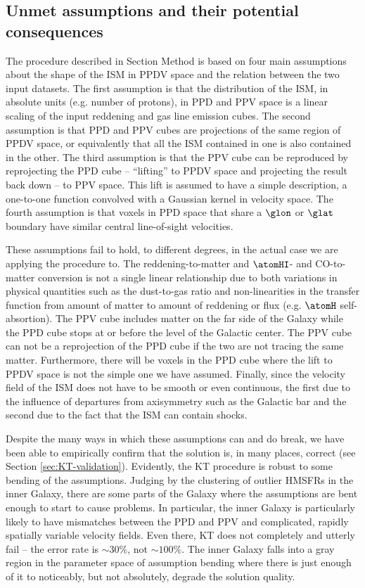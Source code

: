 \subsection{Unmet assumptions and their potential consequences}
\label{sec:discussion-systematics}
The procedure described in Section Method is based on four main assumptions about the shape of the ISM in PPDV space and the relation between the two input datasets.
The first assumption is that the distribution of the ISM, in absolute units (e.g. number of protons), in PPD and PPV space is a linear scaling of the input reddening and gas line emission cubes.
The second assumption is that PPD and PPV cubes are projections of the same region of PPDV space, or equivalently that all the ISM contained in one is also contained in the other.
The third assumption is that the PPV cube can be reproduced by reprojecting the PPD cube -- ``lifting'' to PPDV space and projecting the result back down -- to PPV space.
This lift is assumed to have a simple description, a one-to-one function convolved with a Gaussian kernel in velocity space.
The fourth assumption is that voxels in PPD space that share a $\glon$ or $\glat$ boundary have similar central line-of-sight velocities.

These assumptions fail to hold, to different degrees, in the actual case we are applying the procedure to. 
The reddening-to-matter and $\atomHI$- and CO-to-matter conversion is not a single linear relationship due to both variations in physical quantities such as the dust-to-gas ratio and non-linearities in the transfer function from amount of matter to amount of reddening or flux (e.g. $\atomH$ self-absortion). 
The PPV cube includes matter on the far side of the Galaxy while the PPD cube stops at or before the level of the Galactic center.
The PPV cube can not be a reprojection of the PPD cube if the two are not tracing the same matter. 
Furthermore, there will be voxels in the PPD cube where the lift to PPDV space is not the simple one we have assumed.
Finally, since the velocity field of the ISM does not have to be smooth or even continuous, the first due to the influence of departures from axisymmetry such as the Galactic bar and the second due to the fact that the ISM can contain shocks.

Despite the many ways in which these assumptions can and do break, we have been able to empirically confirm that the solution is, in many places, correct (see Section \ref{sec:KT-validation}). 
Evidently, the KT procedure is robust to some bending of the assumptions.
Judging by the clustering of outlier HMSFRs in the inner Galaxy, there are some parts of the Galaxy where the assumptions are bent enough to start to cause problems.
In particular, the inner Galaxy is particularly likely to have mismatches between the PPD and PPV and complicated, rapidly spatially variable velocity fields.
Even there, KT does not completely and utterly fail -- the error rate is $\sim 30 \%$, not $\sim 100 \%$.
The inner Galaxy falls into a gray region in the parameter space of assumption bending where there is just enough of it to noticeably, but not absolutely, degrade the solution quality.

